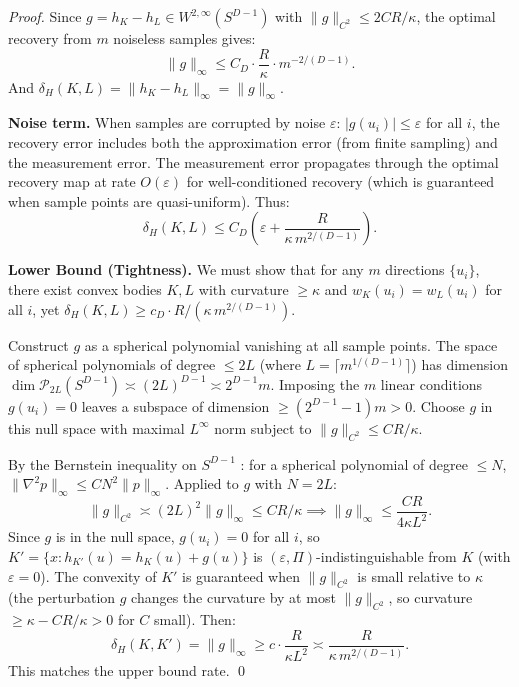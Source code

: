 \begin{proof}
Since $g = h_K - h_L \in W^{2,\infty}(S^{D-1})$ with $\|g\|_{C^2} \leq 2CR/\kappa$, the optimal recovery from $m$ noiseless samples gives:
\[
  \|g\|_\infty \leq C_D \cdot \frac{R}{\kappa} \cdot m^{-2/(D-1)}.
\]
And $\delta_H(K, L) = \|h_K - h_L\|_\infty = \|g\|_\infty$.

\textbf{Noise term.} When samples are corrupted by noise $\varepsilon$: $|g(u_i)| \leq \varepsilon$ for all $i$, the recovery error includes both the approximation error (from finite sampling) and the measurement error. The measurement error propagates through the optimal recovery map at rate $O(\varepsilon)$ for well-conditioned recovery (which is guaranteed when sample points are quasi-uniform). Thus:
\[
  \delta_H(K, L) \leq C_D\!\left(\varepsilon + \frac{R}{\kappa \, m^{2/(D-1)}}\right).
\]

\textbf{Lower Bound (Tightness).}
We must show that for any $m$ directions $\{u_i\}$, there exist convex bodies $K, L$ with curvature $\geq \kappa$ and $w_K(u_i) = w_L(u_i)$ for all $i$, yet $\delta_H(K, L) \geq c_D \cdot R/(\kappa \, m^{2/(D-1)})$.

Construct $g$ as a spherical polynomial vanishing at all sample points. The space of spherical polynomials of degree $\leq 2L$ (where $L = \lceil m^{1/(D-1)} \rceil$) has dimension $\dim \mathcal{P}_{2L}(S^{D-1}) \asymp (2L)^{D-1} \asymp 2^{D-1} m$. Imposing the $m$ linear conditions $g(u_i) = 0$ leaves a subspace of dimension $\geq (2^{D-1} - 1)m > 0$. Choose $g$ in this null space with maximal $L^\infty$ norm subject to $\|g\|_{C^2} \leq CR/\kappa$.

By the Bernstein inequality on $S^{D-1}$ \cite{dai2013approximation}: for a spherical polynomial of degree $\leq N$, $\|\nabla^2 p\|_\infty \leq C N^2 \|p\|_\infty$. Applied to $g$ with $N = 2L$:
\[
  \|g\|_{C^2} \asymp (2L)^2 \|g\|_\infty \leq CR/\kappa \implies \|g\|_\infty \leq \frac{CR}{4\kappa L^2}.
\]
Since $g$ is in the null space, $g(u_i) = 0$ for all $i$, so $K' = \{x : h_{K'}(u) = h_K(u) + g(u)\}$ is $(\varepsilon, \Pi)$-indistinguishable from $K$ (with $\varepsilon = 0$). The convexity of $K'$ is guaranteed when $\|g\|_{C^2}$ is small relative to $\kappa$ (the perturbation $g$ changes the curvature by at most $\|g\|_{C^2}$, so curvature $\geq \kappa - CR/\kappa > 0$ for $C$ small). Then:
\[
  \delta_H(K, K') = \|g\|_\infty \geq c \cdot \frac{R}{\kappa L^2} \asymp \frac{R}{\kappa \, m^{2/(D-1)}}.
\]
This matches the upper bound rate. \qed
\end{proof}

